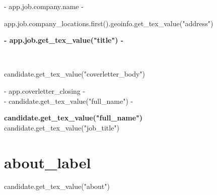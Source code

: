 \documentclass[a4paper, 12pt]{report}
\begin{document}
\vspace{10mm}
{%
{{- app.job.company.name -}} \\
{%
{{ app.job.company_locations.first().geoinfo.get_tex_value("address") }}
{%

\begin{center}
\textbf{ {{- app.job.get_tex_value("title") -}} }\\
\vspace{15mm}
\end{center}

\\

\vspace{-3mm}\setlength\parindent{24pt}

{{ candidate.get_tex_value("coverletter_body") }}

\vspace{5mm}

\vspace{10mm}

\begin{flushleft}
{{- app.coverletter_closing -}}\\
{{- candidate.get_tex_value("full_name") -}}\\
\vspace{3mm}

\end{flushleft}

\pagebreak

\begin{center}
  \textbf{\Huge {{ candidate.get_tex_value("full_name") }}} \\
  \vspace{2mm}
   {{ candidate.get_tex_value("job_title") }}
\end{center}

\vspace{4mm}

{%
\space
\section*{ {{ about_label }} }
{{ candidate.get_tex_value("about") }}
{%

}}}}}
\end{document}
